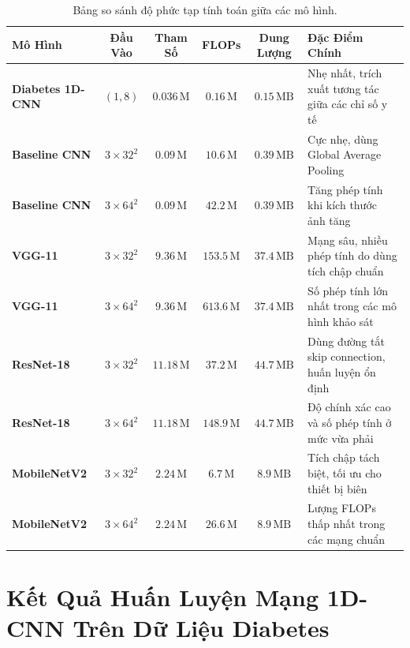 \documentclass[12pt,a4paper]{report}
\begin{document}
\begin{table}[H]
\centering
\caption{Bảng so sánh độ phức tạp tính toán giữa các mô hình.}
\label{tab:theoretical_complexity_benchmark}
\footnotesize
\setlength{\tabcolsep}{4.0pt}
\begin{tabularx}{\textwidth}{lccccX}
\toprule
\textbf{Mô Hình} & \textbf{Đầu Vào} & \textbf{Tham Số} & \textbf{FLOPs} & \textbf{Dung Lượng} & \textbf{Đặc Điểm Chính} \\
\midrule
\textbf{Diabetes 1D-CNN} & $(1, 8)$ & $0.036\,\text{M}$ & $0.16\,\text{M}$ & $0.15\,\text{MB}$ & Nhẹ nhất, trích xuất tương tác giữa các chỉ số y tế \\
\textbf{Baseline CNN} & $3\times 32^2$ & $0.09\,\text{M}$ & $10.6\,\text{M}$ & $0.39\,\text{MB}$ & Cực nhẹ, dùng Global Average Pooling \\
\textbf{Baseline CNN} & $3\times 64^2$ & $0.09\,\text{M}$ & $42.2\,\text{M}$ & $0.39\,\text{MB}$ & Tăng phép tính khi kích thước ảnh tăng \\
\textbf{VGG-11} & $3\times 32^2$ & $9.36\,\text{M}$ & $153.5\,\text{M}$ & $37.4\,\text{MB}$ & Mạng sâu, nhiều phép tính do dùng tích chập chuẩn \\
\textbf{VGG-11} & $3\times 64^2$ & $9.36\,\text{M}$ & $613.6\,\text{M}$ & $37.4\,\text{MB}$ & Số phép tính lớn nhất trong các mô hình khảo sát \\
\textbf{ResNet-18} & $3\times 32^2$ & $11.18\,\text{M}$ & $37.2\,\text{M}$ & $44.7\,\text{MB}$ & Dùng đường tắt skip connection, huấn luyện ổn định \\
\textbf{ResNet-18} & $3\times 64^2$ & $11.18\,\text{M}$ & $148.9\,\text{M}$ & $44.7\,\text{MB}$ & Độ chính xác cao và số phép tính ở mức vừa phải \\
\textbf{MobileNetV2} & $3\times 32^2$ & $2.24\,\text{M}$ & $6.7\,\text{M}$ & $8.9\,\text{MB}$ & Tích chập tách biệt, tối ưu cho thiết bị biên \\
\textbf{MobileNetV2} & $3\times 64^2$ & $2.24\,\text{M}$ & $26.6\,\text{M}$ & $8.9\,\text{MB}$ & Lượng FLOPs thấp nhất trong các mạng chuẩn \\
\bottomrule
\end{tabularx}
\end{table}

\section{Kết Quả Huấn Luyện Mạng 1D-CNN Trên Dữ Liệu Diabetes}
\label{sec:diabetes_1dcnn_training}
\end{document}
